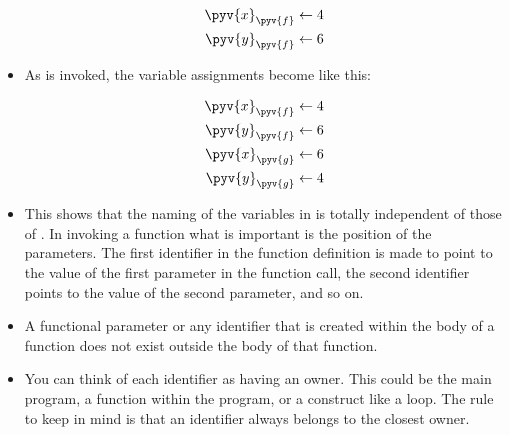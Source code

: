 \documentclass[a4paper]{article}
\begin{document}
\begin{itemize}
\begin{align*}
\pyv{x}_{\pyv{f}} \leftarrow 4\\
\pyv{y}_{\pyv{f}}\leftarrow 6
\end{align*}

\item As  is invoked, the variable assignments become like this:

\begin{align*}
\pyv{x}_{\pyv{f}} \leftarrow 4\\
\pyv{y}_{\pyv{f}}\leftarrow 6\\
\pyv{x}_{\pyv{g}} \leftarrow 6\\
\pyv{y}_{\pyv{g}}\leftarrow 4
\end{align*}

\item This shows that the naming of the variables in  is totally
independent of those of . In invoking a function what is important is the
position of the parameters. The first identifier in the function definition is
made to point to the value of the first parameter in the function call, the
second identifier points to the value of the second parameter, and so on. 

\item A functional parameter or any identifier that is created within the body
of a function does not exist outside the body of that function.

\item You can think of each identifier as having an owner. This could be the
main program, a function within the program, or a construct like a 
loop. The rule to keep in mind is that an identifier always belongs to the
closest owner. 

% 
% 


\end{itemize}
\end{document}
